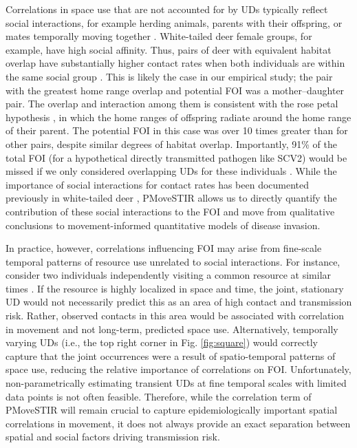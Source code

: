 ﻿\documentclass[11pt]{article}
\begin{document}
Correlations in space use that are not accounted for by UDs typically reflect social interactions, for example
herding animals, parents with their offspring, or mates temporally moving together \citep{Scharf2016,Yang2021}. 
White-tailed deer female groups, for example, have high social affinity. Thus, pairs of deer with equivalent habitat overlap have substantially higher contact rates when both individuals are within the same social group \citep{Schauber2007a,Kjaer2008,Schauber2015a,Grear2010}. This is likely the case in our empirical study; the pair with the greatest home range overlap and potential FOI was a mother--daughter pair. The overlap and interaction among them is consistent with the rose petal hypothesis \citep{Porter1991}, in which the home ranges of offspring radiate around the home range of their parent. The potential FOI in this case was over 10 times greater than for other pairs, despite similar degrees of habitat overlap. Importantly, 91\% of the total FOI (for a hypothetical directly transmitted pathogen like SCV2) would be missed if we only considered overlapping UDs for these individuals \citep[e.g., using a metric like CDE][]{Noonan2021}. While the importance of social interactions for contact rates has been documented previously in white-tailed deer \citep{Grear2010,Schauber2015a}, PMoveSTIR allows us to directly quantify the contribution of these social interactions to the FOI and move from qualitative conclusions to movement-informed quantitative models of disease invasion.

In practice, however, correlations influencing FOI may arise from fine-scale temporal patterns of resource use unrelated to social interactions. For instance, consider two individuals independently visiting a common resource at similar times \citep[e.g., a watering hole,][]{VanderWaal2017}. If the resource is highly localized in space and time, the joint, stationary UD would not necessarily predict this as an area of high contact and transmission risk. Rather, observed contacts in this area would be associated with correlation in movement and not long-term, predicted space use.
Alternatively, temporally varying UDs (i.e., the top right corner in Fig. \ref{fig:square}) would correctly capture that the joint occurrences were a result of spatio-temporal patterns of space use, reducing the relative importance of correlations on FOI. Unfortunately, non-parametrically estimating transient UDs at fine temporal scales with limited data points is not often feasible. Therefore, while the correlation term of PMoveSTIR will remain crucial to capture epidemiologically important spatial correlations in movement, it does not always provide an exact separation between spatial and social factors driving transmission risk.
\end{document}
